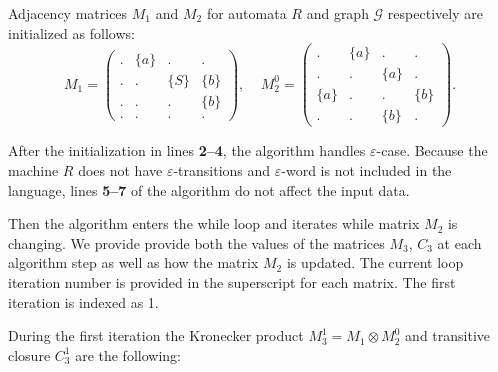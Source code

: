 Adjacency matrices $M_1$ and $M_2$ for automata $R$ and graph $\mathcal{G}$ respectively are initialized as follows:
    $$
    M_1 =
    \begin{pmatrix}
    . & \{a\} & . & .     \\
    . & . & \{S\} & \{b\} \\
    . & . & . & \{b\}     \\
    . & . & . & .
    \end{pmatrix}
    ,~~~~~
    M_2^0 =
    \begin{pmatrix}
    . & \{a\} & . & .     \\
    . & . & \{a\} & .     \\
    \{a\} & . & . & \{b\} \\
    . & . & \{b\} & .
    \end{pmatrix}.
    $$

After the initialization in lines \textbf{2--4}, the algorithm handles $\varepsilon$-case.
Because the machine $R$ does not have $\varepsilon$-transitions and $\varepsilon$-word is not included in the language, lines \textbf{5--7} of the algorithm do not affect the input data.

Then the algorithm enters the while loop and iterates while matrix $M_2$ is changing.
We provide provide both the values of the matrices $M_3$, $C_3$ at each algorithm step as well as how the matrix $M_2$ is updated.
The current loop iteration number is provided in the superscript for each matrix.
The first iteration is indexed as 1.

During the first iteration the Kronecker product $M_3^1 = M_1 \otimes M_2^0$ and transitive closure $C_3^1$ are the following:

